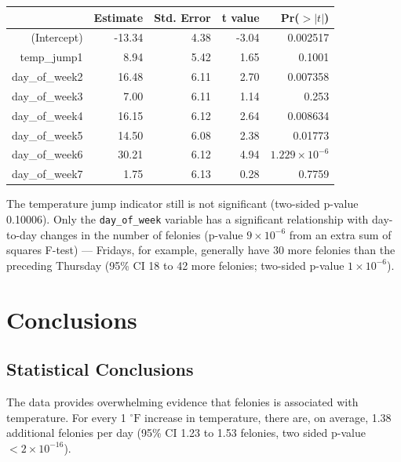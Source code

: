 \documentclass[11pt,notitlepage]{article}
\newcommand{\degf}{^\circ\text{F}}
\begin{document}
\begin{table}[ht]
\footnotesize
\centering
\begin{tabular}{rrrrr}
  \hline
 & Estimate & Std. Error & t value & Pr($>|t|$) \\ 
  \hline
(Intercept) & -13.34 & 4.38 & -3.04 & 0.002517 \\ 
  temp\_jump1 & 8.94 & 5.42 & 1.65 & 0.1001 \\ 
  day\_of\_week2 & 16.48 & 6.11 & 2.70 & 0.007358 \\ 
  day\_of\_week3 & 7.00 & 6.11 & 1.14 & 0.253 \\ 
  day\_of\_week4 & 16.15 & 6.12 & 2.64 & 0.008634 \\ 
  day\_of\_week5 & 14.50 & 6.08 & 2.38 & 0.01773 \\ 
  day\_of\_week6 & 30.21 & 6.12 & 4.94 & $1.229 \times 10^{-6}$ \\ 
  day\_of\_week7 & 1.75 & 6.13 & 0.28 & 0.7759 \\ 
   \hline
\end{tabular}
\end{table}






The temperature jump indicator still is not significant (two-sided p-value 0.10006). Only the \texttt{day_of_week} variable has a significant relationship with day-to-day changes in the number of felonies (p-value $9 \times 10^{-6}$ from an extra sum of squares F-test) --- Fridays, for example, generally have 30 more felonies than the preceding Thursday (95\% CI 18 to 42 more felonies; two-sided p-value $1 \times 10^{-6}$).


\section{Conclusions}
\label{sec:conclusions}

\subsection{Statistical Conclusions}

The data provides overwhelming evidence that felonies is associated with temperature. For every 1 $\degf$ increase in temperature, there are, on average, 1.38 additional felonies per day (95\% CI 1.23 to 1.53 felonies, two sided p-value $<2\times10^{-16}$).
\end{document}

